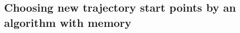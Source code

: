 \subsection{Choosing new trajectory start points by an algorithm with memory}
\label{sub:choosing_new_trajectory_start_points_by_an_algorithm_with_memory}
